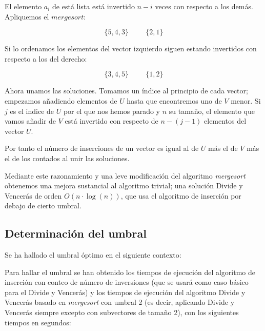 El elemento $a_i$ de está lista está invertido $n-i$ veces con respecto a los demás. Apliquemos el $mergesort$:

$$ \{5,4,3\} \hspace{1cm} \{2,1\}$$

Si lo ordenamos los elementos del vector izquierdo siguen estando invertidos con respecto a los del derecho:

$$\{3,4,5\} \hspace{1cm} \{1,2\}$$

Ahora unamos las soluciones. Tomamos un índice al principio de cada vector; empezamos añadiendo elementos de $U$ hasta que encontremos uno de $V$ menor. Si $j$ es el indice de $U$ por el que nos hemos parado y $n$ su tamaño, el elemento que vamos añadir de $V$ está invertido con respecto de $n-(j-1)$ elementos del vector $U$.

Por tanto el número de inserciones de un vector es igual al de $U$ más el de $V$ más el de los contados al unir las soluciones. 

Mediante este razonamiento y una leve modificación del algoritmo \textit{mergesort} obtenemos una mejora sustancial al algoritmo trivial; una solución Divide y Vencerás de orden $O(n\cdot \log(n))$, que usa el algoritmo de inserción por debajo de cierto umbral.

\subsection{Determinación del umbral}

Se ha hallado el umbral óptimo en el siguiente contexto:


Para hallar el umbral se han obtenido los tiempos de ejecución del algoritmo de inserción con conteo de número de inversiones (que se usará como caso básico para el Divide y Vencerás) y los tiempos de ejecución del algoritmo Divide y Vencerás basado en \textit{mergesort} con umbral 2 (es decir, aplicando Divide y Vencerás siempre excepto con subvectores de tamaño 2), con los siguientes tiempos en segundos:

\vspace*{1cm}

\prefIns
{}\prefDVt
{} {\prefIns}

